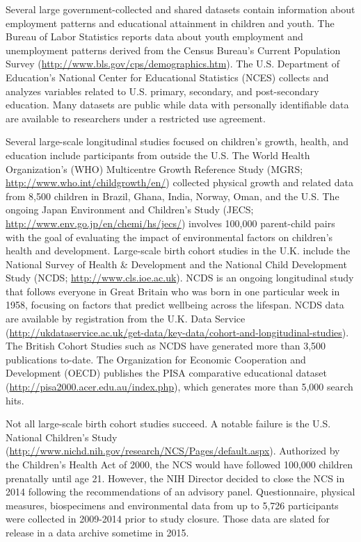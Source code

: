 \documentclass[letterpaper,man,apacite,natbib]{apa6}
\begin{document}
Several large government-collected and shared datasets contain information about employment patterns and educational attainment in children and youth.
The Bureau of Labor Statistics reports data about youth employment and unemployment patterns derived from the Census Bureau's Current Population Survey (\url{http://www.bls.gov/cps/demographics.htm}).
The U.S. Department of Education's National Center for Educational Statistics (NCES) collects and analyzes variables related to U.S. primary, secondary, and post-secondary education.
Many datasets are public while data with personally identifiable data are available to researchers under a restricted use agreement.

Several large-scale longitudinal studies focused on children's growth, health, and education include participants from outside the U.S.
The World Health Organization's (WHO) Multicentre Growth Reference Study (MGRS; \url{http://www.who.int/childgrowth/en/}) collected physical growth and related data from 8,500 children in Brazil, Ghana, India, Norway, Oman, and the U.S.
The ongoing Japan Environment and Children's Study (JECS; \url{http://www.env.go.jp/en/chemi/hs/jecs/}) involves 100,000 parent-child pairs with the goal of evaluating the impact of environmental factors on children's health and development.
Large-scale birth cohort studies in the U.K. include the National Survey of Health \& Development and the National Child Development Study (NCDS; \url{http://www.cls.ioe.ac.uk}).
NCDS is an ongoing longitudinal study that follows everyone in Great Britain who was born in one particular week in 1958, focusing on factors that predict wellbeing across the lifespan.
NCDS data are available by registration from the U.K. Data Service (\url{http://ukdataservice.ac.uk/get-data/key-data/cohort-and-longitudinal-studies}).
The British Cohort Studies such as NCDS have generated more than 3,500 publications to-date.
The Organization for Economic Cooperation and Development (OECD) publishes the PISA comparative educational dataset (\url{http://pisa2000.acer.edu.au/index.php}), which generates more than 5,000 search hits.

Not all large-scale birth cohort studies succeed.
A notable failure is the U.S. National Children's Study (\url{http://www.nichd.nih.gov/research/NCS/Pages/default.aspx}).
Authorized by the Children's Health Act of 2000, the NCS would have followed 100,000 children prenatally until age 21.
However, the NIH Director decided to close the NCS in 2014 following the recommendations of an advisory panel. 
Questionnaire, physical measures, biospecimens and environmental data from up to 5,726 participants were collected in 2009-2014 prior to study closure.
Those data are slated for release in a data archive sometime in 2015.
\end{document}
